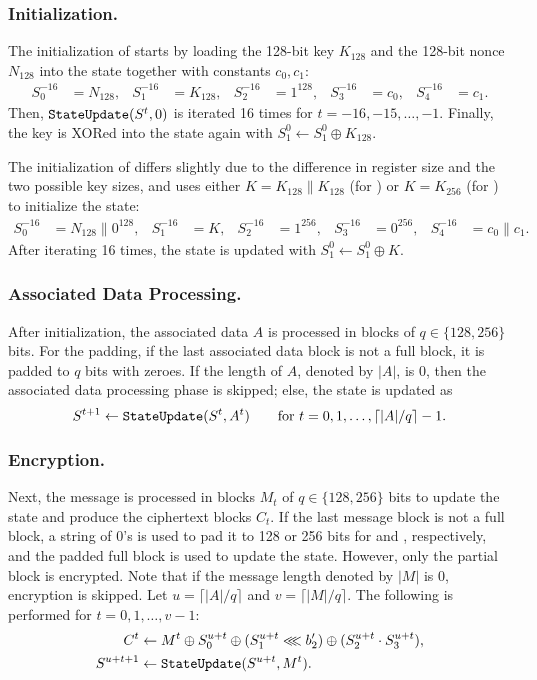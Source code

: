 \subsubsection{Initialization.}
The initialization of \MORUS[640] starts by loading the 128-bit key $K_{128}$ and the 128-bit nonce $N_{128}$ into the state together with constants $c_0, c_1$:
\begin{align*}
S^{-16}_0 &= N_{128}, &
S^{-16}_1 &= K_{128}, &
S^{-16}_2 &= 1^{128}, &
S^{-16}_3 &= c_0, &
S^{-16}_4 &= c_1.
\end{align*}
Then, $\texttt{StateUpdate}{}(S^t,0)$ is iterated 16 times for $t=-16,-15,\ldots,-1$.
Finally, the key is XORed into the state again with $S^0_1 \leftarrow S^0_1 \oplus K_{128}$.

The initialization of \MORUS[1280] differs slightly due to the difference in register size and the two possible key sizes,
and uses either
$K = K_{128} \|K_{128}$ (for \MORUS[1280-128]) or
$K = K_{256}$ (for \MORUS[1280-256])
to initialize the state:
\begin{align*}
S^{-16}_0 &= N_{128} \mathrel\| 0^{128}, &
S^{-16}_1 &= K, &
S^{-16}_2 &= 1^{256}, &
S^{-16}_3 &= 0^{256}, &
S^{-16}_4 &= c_0\mathrel\|c_1.
\end{align*}
After iterating \StateUpdate{} 16 times, the state is updated with $S^0_1 \leftarrow S^0_1 \oplus K$.


\subsubsection{Associated Data Processing.}
After initialization, the associated data $A$ is processed in blocks of $q \in \{128, 256\}$ bits.
For the padding, if the last associated data block is not a full block, it is padded to $q$ bits with zeroes.
If the length of $A$, denoted by $|A|$, is 0, then the associated data processing phase is skipped;
else, the state is updated as
\[S^{t+1} \leftarrow \texttt{StateUpdate}{}(S^t, A^t) \qquad \text{for } t=0,1,\ldots,\lceil |A|/q\rceil-1.\]

\subsubsection{Encryption.}
Next, the message is processed in blocks $M_t$ of  $q \in \{128, 256\}$ bits to update the state and produce the ciphertext blocks $C_t$.
If the last message block is not a full block, a string of 0's is used to pad it to 128 or 256 bits for \MORUS[640] and \MORUS[1280], respectively, and the padded full block is used to update the state. However, only the partial block is encrypted. Note that if the message length denoted by $|M|$ is 0, encryption is skipped.
Let $u = \lceil |A|/q \rceil$ and $v = \lceil |M|/q \rceil$. The following is performed for $t=0, 1, \ldots, v-1$:
\begin{align*}
C^t &\leftarrow M^t \oplus S^{u+t}_0 \oplus (S^{u+t}_1 \lll b_2') \oplus (S^{u+t}_2 \cdot S^{u+t}_3),\\
S^{u+t+1} &\leftarrow \texttt{StateUpdate}{}(S^{u+t},M^t).
\end{align*}

